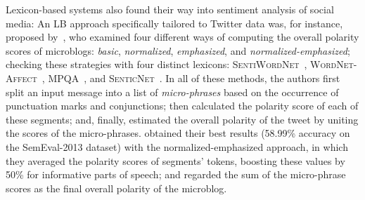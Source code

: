 Lexicon-based systems also found their way into sentiment analysis of
social media: An LB approach specifically tailored to Twitter data
was, for instance, proposed by~\citet{Musto:14}, who examined four
different ways of computing the overall polarity scores of microblogs:
\emph{basic}, \emph{normalized}, \emph{emphasized}, and
\emph{normalized-emphasized}; checking these strategies with four
distinct lexicons: \textsc{Sen\-ti\-Word\-Net}~\cite{Esuli:06c},
\textsc{Word\-Net-\-Affect}~\cite{Strapparava:04},
\textsc{MPQA}~\cite{Wiebe:05}, and
\textsc{SenticNet}~\cite{Cambria:14}.  In all of these methods, the
authors first split an input message into a list of
\emph{micro-phrases} based on the occurrence of punctuation marks and
conjunctions; then calculated the polarity score of each of these
segments; and, finally, estimated the overall polarity of the tweet by
uniting the scores of the micro-phrases.  \citeauthor{Musto:14}
obtained their best results (58.99\% accuracy on the SemEval-2013
dataset) with the normalized-emphasized approach, in which they
averaged the polarity scores of segments' tokens, boosting these
values by 50\% for informative parts of speech; and regarded the sum
of the micro-phrase scores as the final overall polarity of the
microblog.


